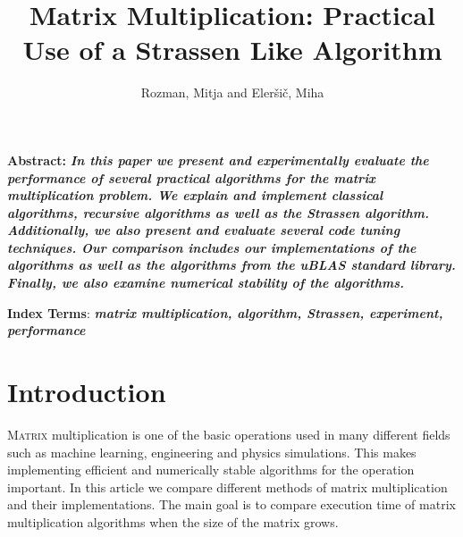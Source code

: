 \documentclass[a4paper,11pt]{article}
\title{Matrix Multiplication: Practical Use of a Strassen Like Algorithm}
\author{Rozman, Mitja and Eleršič, Miha}
\date{}
\renewenvironment{abstract}
{\begin{spacing}{1}\small\textbf{Abstract:}\bfseries\itshape}
{\end{spacing}}
\begin{document}
\maketitle



\begingroup
\renewcommand\thefootnote{}
\endgroup

\begin{abstract}
In this paper we present and experimentally evaluate the performance of several practical algorithms for the matrix multiplication problem. We explain and implement classical algorithms, recursive algorithms as well as the Strassen algorithm. Additionally, we also present and evaluate several code tuning techniques. Our comparison includes our implementations of the algorithms as well as the algorithms from the uBLAS standard library. Finally, we also examine numerical stability of the algorithms.
\end{abstract}
\vspace{0.5cm}
\begin{spacing}{0.9}
\small\textbf{Index Terms}:  \textbf{\textit {matrix multiplication, algorithm, Strassen, experiment, performance}}
\end{spacing}


\section{Introduction}


\lettrine{M}{atrix} multiplication 
is one of the basic operations used in many different fields such 
as machine learning, engineering and physics simulations.
This makes implementing efficient and numerically stable algorithms for the operation important. 
In this article we compare different methods of matrix multiplication and their implementations. 
The main goal is to compare execution time of matrix multiplication algorithms when the size of the matrix grows.
\end{document}
